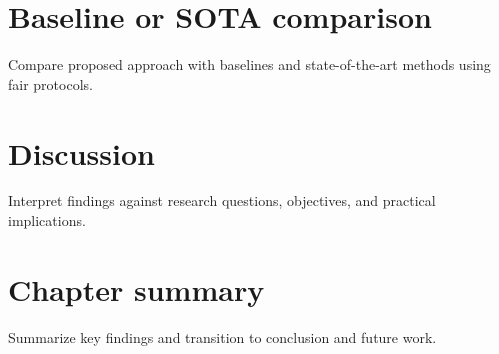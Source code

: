 \section{Baseline or SOTA comparison}
Compare proposed approach with baselines and state-of-the-art methods using fair protocols.

\section{Discussion}
Interpret findings against research questions, objectives, and practical implications.

\section{Chapter summary}
Summarize key findings and transition to conclusion and future work.
